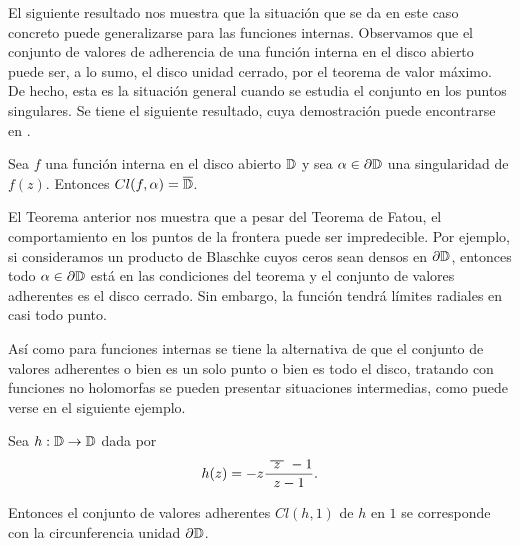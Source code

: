 
El siguiente resultado nos muestra que la situación que se da en este caso concreto puede generalizarse para las funciones internas. Observamos que el conjunto de valores de adherencia de una función interna en el disco abierto puede ser, a lo sumo, el disco unidad cerrado, por el teorema de valor máximo. De hecho, esta es la situación general cuando se estudia el conjunto en los puntos singulares. Se tiene el siguiente resultado, cuya demostración puede encontrarse en \citet[chap. 6]{garnett1981bounded}. \\

\begin{theorem}
    Sea $f$ una función interna en el disco abierto $\mathbb{D}$ y sea $\alpha \in \partial \mathbb{D}$ una singularidad de $f(z)$. Entonces $Cl(f, \alpha) = \overline{\mathbb{D}}$.
\end{theorem}

El Teorema anterior nos muestra que a pesar del Teorema de Fatou, el comportamiento en los puntos de la frontera puede ser impredecible. Por ejemplo, si consideramos un producto de Blaschke cuyos ceros sean densos en $\partial \mathbb{D}$, entonces todo $\alpha \in \partial \mathbb{D}$ está en las condiciones del teorema y el conjunto de valores adherentes es el disco cerrado. Sin embargo, la función tendrá límites radiales en casi todo punto. \\


Así como para funciones internas se tiene la alternativa de que el conjunto de valores adherentes o bien es un solo punto o bien es todo el disco, tratando con funciones no holomorfas se pueden presentar situaciones intermedias, como puede verse en el siguiente ejemplo. \\

\begin{example}
    Sea $h: \mathbb{D} \to \mathbb{D}$ dada por
    \begin{equation*}
        h(z) = -z \frac{\xbar{z} -1}{z - 1}.
    \end{equation*}

    Entonces el conjunto de valores adherentes $Cl(h,1)$ de $h$ en $1$ se corresponde con la circunferencia unidad $\partial \mathbb{D}$.
\end{example}

